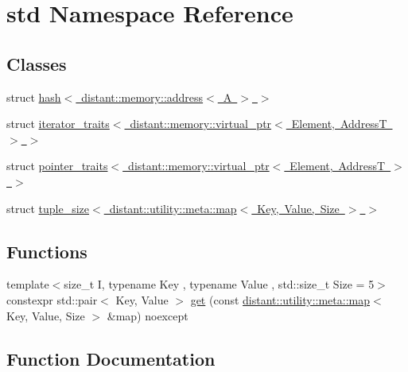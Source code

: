 \hypertarget{namespacestd}{}\section{std Namespace Reference}
\label{namespacestd}
\subsection*{Classes}
\begin{DoxyCompactItemize}
\item 
struct \mbox{\hyperlink{structstd_1_1hash_3_01distant_1_1memory_1_1address_3_01_a_01_4_01_4}{hash$<$ distant\+::memory\+::address$<$ A $>$ $>$}}
\item 
struct \mbox{\hyperlink{structstd_1_1iterator__traits_3_01distant_1_1memory_1_1virtual__ptr_3_01_element_00_01_address_t_01_4_01_4}{iterator\+\_\+traits$<$ distant\+::memory\+::virtual\+\_\+ptr$<$ Element, Address\+T $>$ $>$}}
\item 
struct \mbox{\hyperlink{structstd_1_1pointer__traits_3_01distant_1_1memory_1_1virtual__ptr_3_01_element_00_01_address_t_01_4_01_4}{pointer\+\_\+traits$<$ distant\+::memory\+::virtual\+\_\+ptr$<$ Element, Address\+T $>$ $>$}}
\item 
struct \mbox{\hyperlink{structstd_1_1tuple__size_3_01distant_1_1utility_1_1meta_1_1map_3_01_key_00_01_value_00_01_size_01_4_01_4}{tuple\+\_\+size$<$ distant\+::utility\+::meta\+::map$<$ Key, Value, Size $>$ $>$}}
\end{DoxyCompactItemize}
\subsection*{Functions}
\begin{DoxyCompactItemize}
\item 
{\footnotesize template$<$size\+\_\+t I, typename Key , typename Value , std\+::size\+\_\+t Size = 5$>$ }\\constexpr std\+::pair$<$ Key, Value $>$ \mbox{\hyperlink{namespacestd_a632833fef5f83b44eabafb351a766aa7}{get}} (const \mbox{\hyperlink{classdistant_1_1utility_1_1meta_1_1map}{distant\+::utility\+::meta\+::map}}$<$ Key, Value, Size $>$ \&map) noexcept
\end{DoxyCompactItemize}


\subsection{Function Documentation}
\mbox{\label{namespacestd_a632833fef5f83b44eabafb351a766aa7}} 
